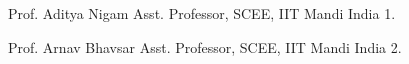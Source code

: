


\begin{cvhonors}


\cvhonor
{Prof. Aditya Nigam} %
{Asst. Professor, SCEE, IIT Mandi} %
{India} %
{1.} %

\cvhonor
{Prof. Arnav Bhavsar} %
{Asst. Professor, SCEE, IIT Mandi} %
{India} %
{2.} %





\end{cvhonors}